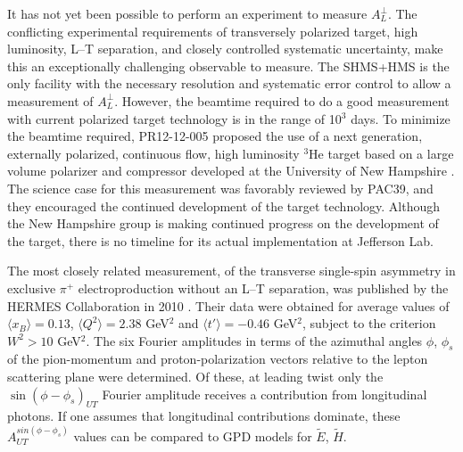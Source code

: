 \documentclass[preprint,superscriptaddress]{revtex4}
\begin{document}
It has not yet been possible to perform an experiment to measure $A_L^{\perp}$.
The conflicting experimental requirements of transversely polarized target,
high luminosity, L--T separation, and closely controlled systematic
uncertainty, make this an exceptionally challenging observable to measure.  The
SHMS+HMS is the only facility with the necessary resolution and systematic
error control to allow a measurement of $A_L^{\perp}$.  However, the beamtime
required to do a good measurement with current polarized target technology is
in the range of 10$^3$ days.  To minimize the beamtime required, PR12-12-005
proposed the use of a next generation, externally polarized, continuous flow,
high luminosity $^3$He target based on a large volume polarizer and compressor
developed at the University of New Hampshire \cite{atpi39}.  The science case
for this measurement was favorably reviewed by PAC39, and they encouraged the
continued development of the target technology.  Although the New Hampshire
group is making continued progress on the development of the target, there is
no timeline for its actual implementation at Jefferson Lab.

The most closely related measurement, of the transverse single-spin asymmetry
in exclusive $\pi^+$ electroproduction without an L--T separation, was
published by the HERMES Collaboration in 2010 \cite{hermes10}.  Their data were
obtained for average values of $\langle x_B \rangle =0.13$, $\langle Q^2 \rangle
=2.38$ GeV$^2$ and $\langle t' \rangle = -0.46$ GeV$^2$, subject to the
criterion $W^2>10$ GeV$^2$.  The six Fourier amplitudes in terms of the
azimuthal angles $\phi$, $\phi_s$ of the pion-momentum and proton-polarization
vectors relative to the lepton scattering plane were determined.  Of these, at
leading twist only the $\sin(\phi-\phi_s)_{UT}$ Fourier amplitude receives a
contribution from longitudinal photons.  If one assumes that longitudinal
contributions dominate, these $A_{UT}^{sin(\phi-\phi_s)}$ values can be
compared to GPD models for $\tilde{E}$, $\tilde{H}$.
\end{document}
